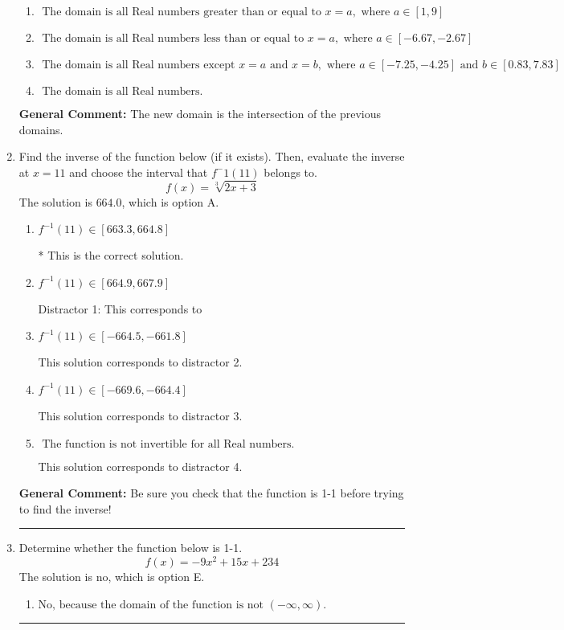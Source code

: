 \documentclass{extbook}[14pt]
\newcommand{\litem}[1]{\item #1

\rule{\textwidth}{0.4pt}}
\begin{document}
\begin{enumerate}
{\begin{enumerate}[label=\Alph*.]
\item \( \text{ The domain is all Real numbers greater than or equal to } x = a, \text{ where } a \in [1, 9] \)


\item \( \text{ The domain is all Real numbers less than or equal to } x = a, \text{ where } a \in [-6.67, -2.67] \)


\item \( \text{ The domain is all Real numbers except } x = a \text{ and } x = b, \text{ where } a \in [-7.25, -4.25] \text{ and } b \in [0.83, 7.83] \)


\item \( \text{ The domain is all Real numbers. } \)


\end{enumerate}

\textbf{General Comment:} The new domain is the intersection of the previous domains.
}
\litem{
Find the inverse of the function below (if it exists). Then, evaluate the inverse at $x = 11$ and choose the interval that $f^-1(11)$ belongs to.
\[ f(x) = \sqrt[3]{2 x + 3} \]The solution is \( 664.0 \), which is option A.\begin{enumerate}[label=\Alph*.]
\item \( f^{-1}(11) \in [663.3, 664.8] \)

* This is the correct solution.
\item \( f^{-1}(11) \in [664.9, 667.9] \)

 Distractor 1: This corresponds to 
\item \( f^{-1}(11) \in [-664.5, -661.8] \)

 This solution corresponds to distractor 2.
\item \( f^{-1}(11) \in [-669.6, -664.4] \)

 This solution corresponds to distractor 3.
\item \( \text{ The function is not invertible for all Real numbers. } \)

 This solution corresponds to distractor 4.
\end{enumerate}

\textbf{General Comment:} Be sure you check that the function is 1-1 before trying to find the inverse!
}
\litem{
Determine whether the function below is 1-1.
\[ f(x) = -9 x^2 + 15 x + 234 \]The solution is \( \text{no} \), which is option E.\begin{enumerate}[label=\Alph*.]
\item \( \text{No, because the domain of the function is not $(-\infty, \infty)$.} \)


\end{enumerate}}
\end{enumerate}
\end{document}
